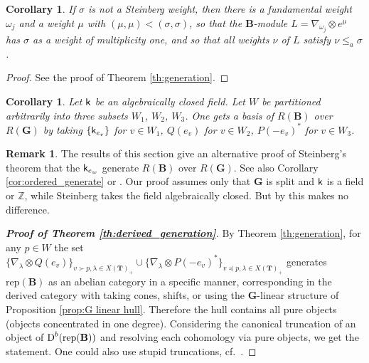 \documentclass[sn-mathphys-num]{sn-jnl}%
\newcommand{\rep}{{\mathrm{rep}}}
\newcommand*{\Dd}{\mathop{\mathrm D\kern0pt}\nolimits}
\newcommand{\sk}{{\sf k}}
\newcommand{\Z}{{\mathbb Z}}
\newcommand{\bg}{\mathbf G}
\newcommand{\fb}{\mathbf B}
\newcommand{\bt}{\mathbf T}
\newtheorem{corollary}[theorem]{Corollary}
\theoremstyle{definition}
\newtheorem{remark}[theorem]{Remark}
\begin{document}
  \begin{corollary}\label{cor:if not Steinberg then tensor}
If $\sigma$ is not a Steinberg weight, then  
 there is a fundamental weight $\omega_j$ and a weight $\mu$ with $(\mu,\mu)<(\sigma,\sigma)$,
 so that the $\fb$-module $L=\nabla_{\omega_j}\otimes e^\mu$  has
$\sigma$ as a weight  of  multiplicity one, and so that all weights  $\nu$ of $L$ satisfy 
$\nu\leq_a\sigma$.
\end{corollary}
\begin{proof}
See the proof of Theorem \ref{th:generation}.
\end{proof}

\begin{corollary}\label{cor:Steinberg_alternative}Let $\sk$ be an algebraically closed field. Let $W$ be partitioned
arbitrarily into three subsets $W_1$, $W_2$, $W_3$. One gets a basis of $R({\fb})$ over $R( \bg )$ by taking
   $\{\sk_{e_v}\}$ for ${v\in W_1}$, $Q(e_v)$ for ${v\in W_2}$,  $P(-e_v)^*$ for ${v\in W_3}$. 
 \end{corollary}

 \begin{remark}
{
The results of this section give an alternative proof of Steinberg's theorem \cite{St} that the $\sk_{e_w}$ generate
$R({\fb})$ over $R( \bg )$. See also Corollary \ref{cor:ordered_generate} or \cite[Theorem 2]{Ana}. Our proof  assumes only that $\bg$ is split and $\sk$ is a field or $\Z$, while
Steinberg takes the field algebraically closed. But by \cite[\S 3]{Serre} this makes no difference.
 }
 \end{remark}
    
\begin{proof}[\rm \bf  Proof of Theorem \ref{th:derived_generation}]
By Theorem \ref{th:generation}, for any $p\in W$ the set
 $\{\nabla_\lambda\otimes Q(e_v)\}_{v\succ p,\lambda\in X( \bt)_+}\cup\{\nabla_\lambda\otimes P(-e_v)^*\}_{v\preceq p,\lambda\in X( \bt)_+}$ generates $\rep({\fb})$ as an abelian category in a specific manner, corresponding in the derived
 category with taking cones, shifts, or using the $\bg$-linear structure of Proposition \ref{prop:G linear hull}. Therefore the hull contains all pure objects (objects concentrated in one degree).
 Considering the canonical truncation of an object of $\Dd^b (\rep ({\fb}))$ and resolving each cohomology via pure objects,
 we get the statement. One could also use stupid truncations, cf.\ \cite[2.5]{Kuzbasech}.
\end{proof}
\end{document}

